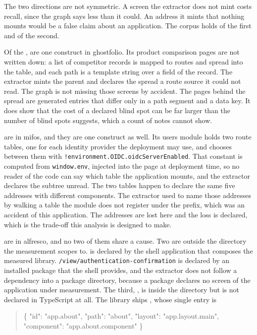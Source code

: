 The two directions are not symmetric. A screen the extractor does not mint costs recall, since the graph says less than it could. An address it mints that nothing mounts would be a false claim about an application. The corpus holds \ProbeMissed{} of the first and \ProbeInvented{} of the second.

Of the \ProbeMissed{}, \ProbeMissedGhostfolio{} are one construct in ghostfolio. Its product comparison pages are not written down: a list of competitor records is mapped to routes and spread into the table, and each path is a template string over a field of the record. The extractor mints the parent and declares the spread a route source it could not read. The graph is not missing those screens by accident. The pages behind the spread are generated entries that differ only in a path segment and a data key. It does show that the cost of a declared blind spot can be far larger than the number of blind spots suggests, which a count of notes cannot show.

\ProbeMissedMifos{} are in mifos, and they are one construct as well. Its users module holds two route tables, one for each identity provider the deployment may use, and chooses between them with \texttt{!environment.OIDC.oidcServerEnabled}. That constant is computed from \texttt{window.env}, injected into the page at deployment time, so no reader of the code can say which table the application mounts, and the extractor declares the subtree unread. The two tables happen to declare the same five addresses with different components. The extractor used to name those addresses by walking a table the module does not register under the prefix, which was an accident of this application. The addresses are lost here and the loss is declared, which is the trade-off this analysis is designed to make.

\ProbeMissedAlfresco{} are in alfresco, and no two of them share a cause. Two are outside the directory the measurement scopes to.  is declared by the shell application that composes the measured library. \texttt{/view/\allowbreak{}authentication-\allowbreak{}confirmation} is declared by an installed package that the shell provides, and the extractor does not follow a dependency into a package directory, because a package declares no screen of the application under measurement. The third, , is inside the directory but is not declared in TypeScript at all. The library ships , whose single entry is

\begin{quote}\footnotesize\ttfamily
\{ "id": "app.about", "path": "about", "layout": "app.layout.main",\\
\hphantom{\{ }"component": "app.about.component" \}
\end{quote}

